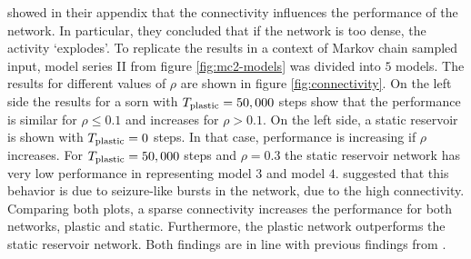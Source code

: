 \textcite{lazar2009sorn} showed in their appendix that the connectivity influences the performance of the network. In particular, they concluded that if the network is too dense, the activity `explodes'. To replicate the results in a context of Markov chain sampled input, model series II from figure \ref{fig:mc2-models} was divided into $5$ models. The results for different values of $\rho$ are shown in figure \ref{fig:connectivity}. On the left side the results for a \acs{sorn} with $T_{\text{plastic}} = 50,000$ steps show that the performance is similar for $\rho \le 0.1$ and increases for $\rho > 0.1$. On the left side, a static reservoir is shown with $T_{\text{plastic}} = 0$ steps. In that case, performance is increasing if $\rho$ increases. For $T_{\text{plastic}} = 50,000$ steps and $\rho= 0.3$ the static reservoir network has very low performance in representing model $3$ and model $4$. \textcite{lazar2009sorn} suggested that this behavior is due to seizure-like bursts in the network, due to the high connectivity. Comparing both plots, a sparse connectivity increases the performance for both networks, plastic and static. Furthermore, the plastic network outperforms the static reservoir network. Both findings are in line with previous findings from \textcite{lazar2009sorn}.


